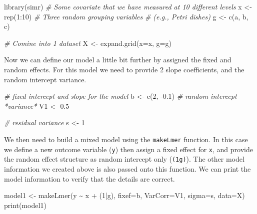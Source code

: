 \documentclass[
]{book}
\newenvironment{Shaded}{\begin{snugshade}}{\end{snugshade}}
\newcommand{\AttributeTok}[1]{\textcolor[rgb]{0.77,0.63,0.00}{#1}}
\newcommand{\CommentTok}[1]{\textcolor[rgb]{0.56,0.35,0.01}{\textit{#1}}}
\newcommand{\DecValTok}[1]{\textcolor[rgb]{0.00,0.00,0.81}{#1}}
\newcommand{\FloatTok}[1]{\textcolor[rgb]{0.00,0.00,0.81}{#1}}
\newcommand{\FunctionTok}[1]{\textcolor[rgb]{0.00,0.00,0.00}{#1}}
\newcommand{\NormalTok}[1]{#1}
\newcommand{\OtherTok}[1]{\textcolor[rgb]{0.56,0.35,0.01}{#1}}
\newcommand{\SpecialCharTok}[1]{\textcolor[rgb]{0.00,0.00,0.00}{#1}}
\newcommand{\StringTok}[1]{\textcolor[rgb]{0.31,0.60,0.02}{#1}}
\begin{document}
\begin{Shaded}
\begin{Highlighting}[]
\FunctionTok{library}\NormalTok{(simr)}
\CommentTok{\# Some covariate that we have measured at 10 different levels}
\NormalTok{x }\OtherTok{\textless{}{-}} \FunctionTok{rep}\NormalTok{(}\DecValTok{1}\SpecialCharTok{:}\DecValTok{10}\NormalTok{)}
\CommentTok{\# Three random grouping variables }
\CommentTok{\# (e.g., Petri dishes)}
\NormalTok{g }\OtherTok{\textless{}{-}} \FunctionTok{c}\NormalTok{(}\StringTok{\textquotesingle{}a\textquotesingle{}}\NormalTok{, }\StringTok{\textquotesingle{}b\textquotesingle{}}\NormalTok{, }\StringTok{\textquotesingle{}c\textquotesingle{}}\NormalTok{)}

\CommentTok{\# Comine into 1 dataset}
\NormalTok{X }\OtherTok{\textless{}{-}} \FunctionTok{expand.grid}\NormalTok{(}\AttributeTok{x=}\NormalTok{x, }\AttributeTok{g=}\NormalTok{g)}
\end{Highlighting}
\end{Shaded}

Now we can define our model a little bit further by assigned the fixed and random effects. For this model we need to provide 2 slope coefficients, and the random intercept variance.

\begin{Shaded}
\begin{Highlighting}[]
\CommentTok{\# fixed intercept and slope for the model}
\NormalTok{b }\OtherTok{\textless{}{-}} \FunctionTok{c}\NormalTok{(}\DecValTok{2}\NormalTok{, }\SpecialCharTok{{-}}\FloatTok{0.1}\NormalTok{) }
\CommentTok{\# random intercept *variance*}
\NormalTok{V1 }\OtherTok{\textless{}{-}} \FloatTok{0.5} 

\CommentTok{\# residual variance}
\NormalTok{s }\OtherTok{\textless{}{-}} \DecValTok{1} 
\end{Highlighting}
\end{Shaded}

We then need to build a mixed model using the \texttt{makeLmer} function. In this case we define a new outcome variable (\texttt{y}) then assign a fixed effect for \texttt{x}, and provide the random effect structure as random intercept only (\texttt{(1\textbar{}g)}). The other model information we created above is also passed onto this function. We can print the model information to verify that the details are correct.

\begin{Shaded}
\begin{Highlighting}[]
\NormalTok{model1 }\OtherTok{\textless{}{-}} \FunctionTok{makeLmer}\NormalTok{(y }\SpecialCharTok{\textasciitilde{}}\NormalTok{ x }\SpecialCharTok{+}\NormalTok{ (}\DecValTok{1}\SpecialCharTok{|}\NormalTok{g),}
                   \AttributeTok{fixef=}\NormalTok{b, }
                   \AttributeTok{VarCorr=}\NormalTok{V1, }
                   \AttributeTok{sigma=}\NormalTok{s, }
                   \AttributeTok{data=}\NormalTok{X)}
\FunctionTok{print}\NormalTok{(model1)}
\end{Highlighting}
\end{Shaded}
\end{document}
